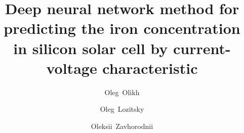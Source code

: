 \documentclass[a4paper,fleqn]{cas-sc}
\begin{document}
\let\WriteBookmarks\relax
\def\floatpagepagefraction{1}
\def\textpagefraction{.001}

\title [mode = title]{Deep neural network method for predicting the iron concentration in silicon solar cell by current-voltage characteristic}





\author[1]{Oleg~Olikh}
\cormark[1]


\address[1]{Taras Shevchenko National University of Kyiv, 64/13, Volodymyrska Street, City of Kyiv, Ukraine, 01601}

\author[1]{Oleg~Lozitsky}%


\author[1]{Oleksii~Zavhorodnii}


%


%
\end{document}
